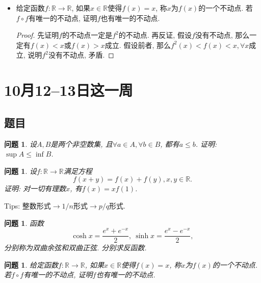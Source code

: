 \documentclass[UTF8,11pt, a4paper, oneside, fontset=none]{ctexbook}
\newtheorem{question}[theorem]{问题}
\begin{document}
\begin{itemize}
\begin{proof}
\[
f(\frac{p}{q}) = f (\overbrace{\frac{1}{q} + \cdots + \frac{1}{q}}^{p\mbox{个}}) = p f(\frac{1}{q}) = p \frac{\overbrace{f(\frac{1}{q}) + \cdots +f(\frac{1}{q})}^{q\mbox{个}}}{q} = \frac{p}{q} f(1).
\]
\end{proof}

\item 给定函数$f : \mathbb R \to \mathbb R$, 如果$x \in \mathbb R$使得$f(x) =x$, 称$x$为$f(x)$的一个不动点. 若$f \circ f$有唯一的不动点, 证明$f$也有唯一的不动点.

\begin{proof}
先证明$f$的不动点一定是$f^2$的不动点. 再反证, 假设$f$没有不动点, 那么一定有$f(x) < x$或$f(x) >x$成立. 假设前者, 那么$f^2 (x) < f(x) < x, \forall x$成立, 说明$f^2$没有不动点, 矛盾.
\end{proof}


\end{itemize}

\clearpage

\section{10月12--13日这一周}

\subsection*{题目}

\begin{question}
设$A, B$是两个非空数集, 且$\forall a \in A, \forall b \in B$, 都有$a \leq b$. 证明: $\sup A \leq \inf B$.
\end{question}

\begin{question}
设$f : \mathbb R \to \mathbb R$满足方程
\[
f(x + y) = f(x) + f(y), x, y \in \mathbb R.
\]
证明: 对一切有理数$x$, 有$f(x) = xf(1)$.
\end{question}

Tips: 整数形式$\rightarrow$$1/n$形式$\rightarrow$$p/q$形式.

\begin{question}
函数
\[
\cosh x = \frac{e^x + e^{-x}}{2}, \ \sinh x = \frac{e^x - e^{-x}}{2},
\]
分别称为双曲余弦和双曲正弦. 分别求反函数.
\end{question}

\begin{question}
给定函数$f : \mathbb R \to \mathbb R$, 如果$x \in \mathbb R$使得$f(x) =x$, 称$x$为$f(x)$的一个不动点. 若$f \circ f$有唯一的不动点, 证明$f$也有唯一的不动点.
\end{question}
\end{document}
